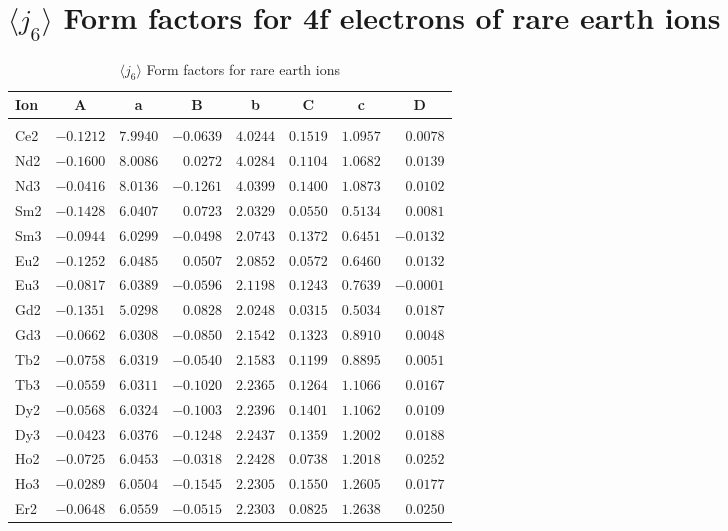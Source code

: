 \section{{\large $\langle j_6\rangle$} Form factors for 4f electrons of rare earth ions}
\begin{table}[H]
\caption{$\langle j_6\rangle$ Form factors for rare earth ions}\vspace{2mm}
\label{rej6}
{\tablesize
\begin{tabular}{lrrrrrrr}
\hline
Ion&
\multicolumn{1}{c}{A}&\multicolumn{1}{c}{a}&
\multicolumn{1}{c}{B}&\multicolumn{1}{c}{b}&
\multicolumn{1}{c}{C}&\multicolumn{1}{c}{c}&\multicolumn{1}{c}{D}\\
\hline\\[-2ex]
Ce2 &$-0.1212$ &$7.9940$ &$-0.0639$ &$4.0244$ &$0.1519$ &$1.0957$ &$0.0078$ \\
Nd2 &$-0.1600$ &$8.0086$ &$0.0272$ &$4.0284$ &$0.1104$ &$1.0682$ &$0.0139$ \\
Nd3 &$-0.0416$ &$8.0136$ &$-0.1261$ &$4.0399$ &$0.1400$ &$1.0873$ &$0.0102$ \\
Sm2 &$-0.1428$ &$6.0407$ &$0.0723$ &$2.0329$ &$0.0550$ &$0.5134$ &$0.0081$ \\
Sm3 &$-0.0944$ &$6.0299$ &$-0.0498$ &$2.0743$ &$0.1372$ &$0.6451$ &$-0.0132$ \\
Eu2 &$-0.1252$ &$6.0485$ &$0.0507$ &$2.0852$ &$0.0572$ &$0.6460$ &$0.0132$ \\
Eu3 &$-0.0817$ &$6.0389$ &$-0.0596$ &$2.1198$ &$0.1243$ &$0.7639$ &$-0.0001$ \\
Gd2 &$-0.1351$ &$5.0298$ &$0.0828$ &$2.0248$ &$0.0315$ &$0.5034$ &$0.0187$ \\
Gd3 &$-0.0662$ &$6.0308$ &$-0.0850$ &$2.1542$ &$0.1323$ &$0.8910$ &$0.0048$ \\
Tb2 &$-0.0758$ &$6.0319$ &$-0.0540$ &$2.1583$ &$0.1199$ &$0.8895$ &$0.0051$ \\
Tb3 &$-0.0559$ &$6.0311$ &$-0.1020$ &$2.2365$ &$0.1264$ &$1.1066$ &$0.0167$ \\
Dy2 &$-0.0568$ &$6.0324$ &$-0.1003$ &$2.2396$ &$0.1401$ &$1.1062$ &$0.0109$ \\
Dy3 &$-0.0423$ &$6.0376$ &$-0.1248$ &$2.2437$ &$0.1359$ &$1.2002$ &$0.0188$ \\
Ho2 &$-0.0725$ &$6.0453$ &$-0.0318$ &$2.2428$ &$0.0738$ &$1.2018$ &$0.0252$ \\
Ho3 &$-0.0289$ &$6.0504$ &$-0.1545$ &$2.2305$ &$0.1550$ &$1.2605$ &$0.0177$ \\
Er2 &$-0.0648$ &$6.0559$ &$-0.0515$ &$2.2303$ &$0.0825$ &$1.2638$ &$0.0250$ \\

\end{tabular}}
\end{table}
